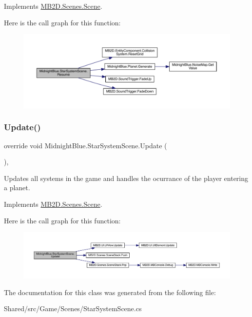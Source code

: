 Implements \hyperlink{class_m_b2_d_1_1_scenes_1_1_scene_ad13639db22b059a1b714eefd9d927735}{M\+B2\+D.\+Scenes.\+Scene}.

Here is the call graph for this function\+:
\nopagebreak
\begin{figure}[H]
\begin{center}
\leavevmode
\includegraphics[width=350pt]{class_midnight_blue_1_1_star_system_scene_aefbf0750a7ce153b923bcabb132e4875_cgraph}
\end{center}
\end{figure}
\hypertarget{class_midnight_blue_1_1_star_system_scene_ac36506b721064e015a9f93140681d93a}{}\label{class_midnight_blue_1_1_star_system_scene_ac36506b721064e015a9f93140681d93a} 
\subsubsection{\texorpdfstring{Update()}{Update()}}
{\footnotesize\ttfamily override void Midnight\+Blue.\+Star\+System\+Scene.\+Update (\begin{DoxyParamCaption}{ }\end{DoxyParamCaption})\hspace{0.3cm}{\ttfamily [inline]}, {\ttfamily [virtual]}}



Updates all systems in the game and handles the ocurrance of the player entering a planet. 



Implements \hyperlink{class_m_b2_d_1_1_scenes_1_1_scene_a779de7c1ab23b698dcde3a228324a991}{M\+B2\+D.\+Scenes.\+Scene}.

Here is the call graph for this function\+:
\nopagebreak
\begin{figure}[H]
\begin{center}
\leavevmode
\includegraphics[width=350pt]{class_midnight_blue_1_1_star_system_scene_ac36506b721064e015a9f93140681d93a_cgraph}
\end{center}
\end{figure}


The documentation for this class was generated from the following file\+:\begin{DoxyCompactItemize}
\item 
Shared/src/\+Game/\+Scenes/Star\+System\+Scene.\+cs\end{DoxyCompactItemize}
